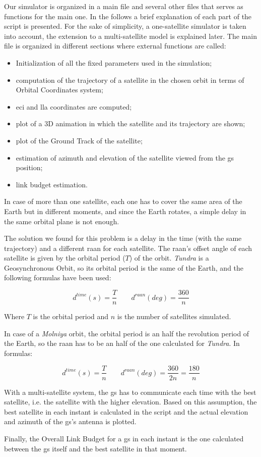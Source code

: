 Our simulator is organized in a main file and several other files that serves as functions for the main one.
In the follows a brief explanation of each part of the script is presented. For the sake of simplicity, a one-satellite simulator is taken into account, the extension to a multi-satellite model is explained later.
The main file is organized in different sections where external functions are called:
	\begin{itemize}
		\item Initialization of all the fixed parameters used in the simulation;
		\item computation of the trajectory of a satellite in the chosen orbit in terms of Orbital Coordinates system;
		\item \gls{eci} and \gls{lla} coordinates are computed;
		\item plot of a 3D animation in which the satellite and its trajectory are shown;
		\item plot of the Ground Track of the satellite;
		\item estimation of azimuth and elevation of the satellite viewed from the \gls{gs} position;
		\item link budget estimation.
	\end{itemize}

In case of more than one satellite, each one has to cover the same area of the Earth but in different moments, and since the Earth rotates, a simple delay in the same orbital plane is not enough.

The solution we found for this problem is a delay in the time (with the same trajectory) and a different \gls{raan} for each satellite.
The \gls{raan}'s offset angle of each satellite is given by the orbital period ($T$) of the orbit.
\textit{Tundra} is a Geosynchronous Orbit, so its orbital period is the same of the Earth, and the following formulas have been used:

\begin{equation}
	d^{time}(s) = \frac{T}{n} \qquad d^{raan}(deg) = \frac{360}{n}
\end{equation}

Where $T$ is the orbital period and $n$ is the number of satellites simulated.

In case of a \textit{Molniya} orbit, the orbital period is an half the revolution period of the Earth, so the \gls{raan} has to be an half of the one calculated for \textit{Tundra}. In formulas:

\begin{equation}
	d^{time}(s) = \frac{T}{n} \qquad d^{raan}(deg) = \frac{360}{2n} = \frac{180}{n}
\end{equation}

With a multi-satellite system, the \gls{gs} has to communicate each time with the best satellite, i.e. the satellite with the higher elevation. Based on this assumption, the best satellite in each instant is calculated in the script and the actual elevation and azimuth of the \gls{gs}'s antenna is plotted.

Finally, the Overall Link Budget for a \gls{gs} in each instant is the one calculated between the \gls{gs} itself and the best satellite in that moment.
